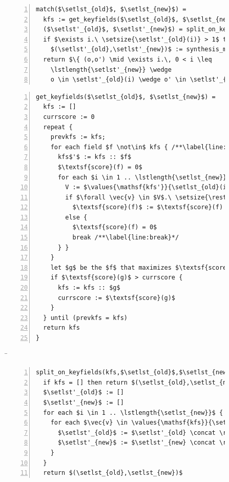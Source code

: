 \documentclass[natbib,10pt]{sigplanconf}
\begin{document}
\begin{figure}
\begin{tabbing}
\begin{minipage}{3.9in}
\begin{lstlisting}[numbers=left]
match($\setlst_{old}$, $\setlst_{new}$) =
  kfs := get_keyfields($\setlst_{old}$, $\setlst_{new}$) /**\label{line:getfields}*/
  ($\setlst'_{old}$, $\setlst'_{new}$) = split_on_keyfields(kfs,$\setlst_{old}$,$\setlst_{new}$) /**\label{line:split}*/
  if $\exists i.\ \setsize{\setlst'_{old}(i)} > 1$ then /**\label{line:singleton-check}*/
    $(\setlst'_{old},\setlst'_{new})$ := synthesis_match($\setlst'_{old}$, $\setlst'_{new}$) /**\label{line:match}*/
  return $\{ (o,o') \mid \exists i.\, 0 < i \leq
    \lstlength{\setlst'_{new}} \wedge
    o \in \setlst'_{old}(i) \wedge o' \in \setlst'_{new}(i) \}$
\end{lstlisting}

\begin{lstlisting}[numbers=left,firstnumber=last]
get_keyfields($\setlst_{old}$, $\setlst_{new}$) =
  kfs := []
  currscore := 0
  repeat {
    prevkfs := kfs;
    for each field $f \not\in$ kfs { /**\label{line:firstloop}*/
      kfs$'$ := kfs :: $f$
      $\textsf{score}(f) = 0$
      for each $i \in 1 .. \lstlength{\setlst_{new}}$ {  /**\label{line:innerloop}*/
        V := $\values{\mathsf{kfs'}}{\setlst_{old}(i)}$
        if $\forall \vec{v} \in $V$.\ \setsize{\restrictval{\set_{old}(i)}{\mathsf{kfs'}}{\vec{v}}} = \setsize{\restrictval{\set_{new}(i)}{\mathsf{kfs'}}{\vec{v}}}$ then /**\label{line:if-val}*/
          $\textsf{score}(f)$ := $\textsf{score}(f) + \setsize{$V$}$
        else {
          $\textsf{score}(f) = 0$
          break /**\label{line:break}*/
      } }
    }
    let $g$ be the $f$ that maximizes $\textsf{score}(f)$
    if $\textsf{score}(g)$ > currscore {
      kfs := kfs :: $g$
      currscore := $\textsf{score}(g)$
    }
  } until (prevkfs = kfs)
  return kfs
}
\end{lstlisting}
\end{minipage}
\=
\begin{minipage}{3.2in}
\begin{lstlisting}[numbers=left,firstnumber=last]
split_on_keyfields(kfs,$\setlst_{old}$,$\setlst_{new}$) =
  if kfs = [] then return $(\setlst_{old},\setlst_{new})$
  $\setlst'_{old}$ := []
  $\setlst'_{new}$ := []
  for each $i \in 1 .. \lstlength{\setlst_{new}}$ {
    for each $\vec{v} \in \values{\mathsf{kfs}}{\setlst_{old}(i) \cup \setlst_{new}(i)}$ {
      $\setlst'_{old}$ := $\setlst'_{old} \concat \restrictval{\set_{old}(i)}{\mathsf{kfs}}{\vec{v}}$
      $\setlst'_{new}$ := $\setlst'_{new} \concat \restrictval{\set_{new}(i)}{\mathsf{kfs}}{\vec{v}}$
    }
  }
  return $(\setlst_{old},\setlst_{new})$
\end{lstlisting}


\end{minipage}
\end{tabbing}
\end{figure}
\end{document}
